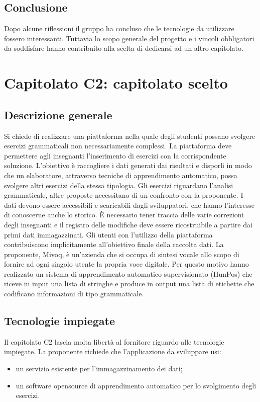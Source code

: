 \documentclass[11pt,a4paper]{article}
\begin{document}
	\subsection{Conclusione}
	Dopo alcune riflessioni il gruppo ha concluso che le tecnologie da utilizzare fossero interessanti.
	Tuttavia lo scopo generale del progetto e i vincoli obbligatori da soddisfare hanno contribuito alla
	scelta di dedicarsi ad un altro capitolato.
	\newpage
	\section{Capitolato C2: capitolato scelto}
	\subsection{Descrizione generale}
	Si chiede di realizzare una piattaforma nella quale degli studenti possano svolgere esercizi grammaticali non necessariamente complessi. La piattaforma deve permettere agli insegnanti l'inserimento di esercizi con la corrispondente soluzione. L'obiettivo è raccogliere i dati generati dai risultati e disporli in modo che un elaboratore, attraverso tecniche di apprendimento automatico, possa svolgere altri esercizi della stessa tipologia. Gli esercizi riguardano l'analisi grammaticale, altre proposte necessitano di un confronto con la proponente. I dati devono essere accessibili e scaricabili dagli sviluppatori, che hanno l'interesse di conoscerne anche lo storico. È necessario tener traccia delle varie correzioni degli insegnanti e il registro delle modifiche deve essere ricostruibile a partire dai primi dati immagazzinati. Gli utenti con l'utilizzo della piattaforma contribuiscono implicitamente all'obiettivo finale della raccolta dati. La proponente, Mivoq, è un'azienda che si occupa di sintesi vocale allo scopo di fornire ad ogni singolo utente la propria voce digitale. Per questo motivo hanno realizzato un sistema di apprendimento automatico supervisionato (HunPos) che riceve in input una lista di stringhe e produce in output una lista di etichette che codificano informazioni di tipo grammaticale.
	\subsection{Tecnologie impiegate}
	Il capitolato C2 lascia molta libertà al fornitore riguardo alle tecnologie impiegate. La proponente richiede che l'applicazione da sviluppare usi:
	\begin{itemize}
		\item un servizio esistente per l'immagazzinamento dei dati;
		\item un software opensource di apprendimento automatico per lo svolgimento degli esercizi.
	\end{itemize}
	
\end{document}
